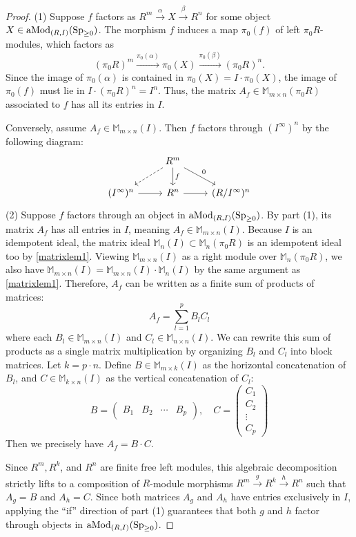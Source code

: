 \documentclass[a4paper,10pt, oneside]{amsart}
\begin{document}
	\begin{proof}
		(1)  Suppose $f$ factors as $R^m \xrightarrow{\alpha} X \xrightarrow{\beta} R^n$ for some object $X \in \operatorname{aMod}_{(R,I)}(\operatorname{Sp}_{\geq0})$.  The morphism $f$ induces a map $\pi_0(f)$ of left $\pi_0R$-modules, which factors as $$(\pi_0 R)^m \xrightarrow{\pi_0(\alpha)} \pi_0(X) \xrightarrow{\pi_0(\beta)} (\pi_0 R)^n.$$ Since the image of $\pi_0(\alpha)$ is contained in $\pi_0(X)=I \cdot \pi_0(X)$, the image of $\pi_0(f)$ must lie in $I \cdot (\pi_0 R)^n = I^n$. Thus, the matrix $A_f \in \mathbb{M}_{m\times n}(\pi_0 R)$ associated to $f$ has all its entries in $I$.
		
		 Conversely, assume $A_f \in \mathbb{M}_{m\times n}(I)$. 
		Then $f$ factors through $(I^\infty)^n$ by the following diagram: $$\begin{tikzcd}
			& R^m \arrow[ld, dashed] \arrow[d, "f"] \arrow[rd, "0"] &                \\
			(I^\infty)^n \arrow[r] & R^n \arrow[r]                                    & (R/I^\infty)^n
		\end{tikzcd}$$	
		(2) Suppose $f$ factors through an object in $\operatorname{aMod}_{(R,I)}(\operatorname{Sp}_{\geq0})$. By part (1), its matrix $A_f$ has all entries in $I$, meaning $A_f \in \mathbb{M}_{m\times n}(I)$. Because $I$ is an idempotent ideal, the matrix ideal $\mathbb{M}_n(I) \subset \mathbb{M}_n(\pi_0R)$ is an idempotent ideal too by \cref{matrixlem1}. Viewing $\mathbb{M}_{m\times n}(I)$ as a right module over $\mathbb{M}_n(\pi_0R)$, we also have $\mathbb{M}_{m\times n}(I) = \mathbb{M}_{m\times n}(I) \cdot \mathbb{M}_n(I)$ by the same argument as \cref{matrixlem1}. Therefore, $A_f$ can be written as a finite sum of products of matrices:
		$$ A_f = \sum_{l=1}^p B_l C_l $$
		where each $B_l \in \mathbb{M}_{m\times n}(I)$ and $C_l \in \mathbb{M}_{n\times n}(I)$. 
		We can rewrite this sum of products as a single matrix multiplication by organizing $B_l$ and $C_l$ into block matrices. Let $k = p \cdot n$. Define $B \in \mathbb{M}_{m\times k}(I)$ as the horizontal concatenation of $B_l$, and $C \in \mathbb{M}_{k\times n}(I)$ as the vertical concatenation of $C_l$:
		$$ B = \begin{pmatrix} B_1 & B_2 & \cdots & B_p \end{pmatrix}, \quad C = \begin{pmatrix} C_1 \\ C_2 \\ \vdots \\ C_p \end{pmatrix} $$
		Then we precisely have $A_f = B \cdot C$. 
		
		Since $R^m, R^k$, and $R^n$ are finite free left modules, this algebraic decomposition strictly lifts to a composition of $R$-module morphisms $R^m \xrightarrow{g} R^k \xrightarrow{h} R^n$ such that $A_g = B$ and $A_h = C$. Since both matrices $A_g$ and $A_h$ have entries exclusively in $I$, applying the ``if'' direction of part (1) guarantees that both $g$ and $h$ factor through objects in $\operatorname{aMod}_{(R,I)}(\operatorname{Sp}_{\geq0})$.
	\end{proof}
\end{document}
